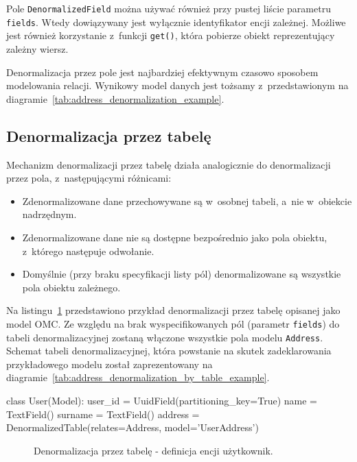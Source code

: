 Pole \verb+DenormalizedField+ można używać również przy pustej liście parametru \verb+fields+. Wtedy dowiązywany jest wyłącznie identyfikator encji zależnej. Możliwe jest również korzystanie z~funkcji \verb+get()+, która pobierze obiekt reprezentujący zależny wiersz.

Denormalizacja przez pole jest najbardziej efektywnym czasowo sposobem modelowania relacji. Wynikowy model danych jest tożsamy z~przedstawionym na diagramie~\ref{tab:address_denormalization_example}.

\subsection{Denormalizacja przez tabelę}

Mechanizm denormalizacji przez tabelę działa analogicznie do denormalizacji przez pola, z~następującymi różnicami:

\begin{itemize}
	\item Zdenormalizowane dane przechowywane są w~osobnej tabeli, a~nie w~obiekcie nadrzędnym. 
	\item Zdenormalizowane dane nie są dostępne bezpośrednio jako pola obiektu, z~którego następuje odwołanie. 
	\item Domyślnie (przy braku specyfikacji listy pól) denormalizowane są wszystkie pola obiektu zależnego.
\end{itemize}

Na listingu~\ref{lst:denormalization_by_table_example} przedstawiono przykład denormalizacji przez tabelę opisanej jako model OMC. Ze względu na brak wyspecifikowanych pól (parametr \verb+fields+) do tabeli denormalizacyjnej zostaną włączone wszystkie pola modelu \verb+Address+. Schemat tabeli denormalizacyjnej, która powstanie na skutek zadeklarowania przykładowego modelu został zaprezentowany na diagramie~\ref{tab:address_denormalization_by_table_example}.

\begin{verbbox}[\footnotesize]
class User(Model):
    user_id = UuidField(partitioning_key=True)
    name = TextField()
    surname = TextField()
    address = DenormalizedTable(relates=Address, model='UserAddress')
\end{verbbox}

\begin{figure}[ht!]
	\centering
	\theverbbox
	\caption{Denormalizacja przez tabelę - definicja encji użytkownik.}
	\label{lst:denormalization_by_table_example}
\end{figure}

